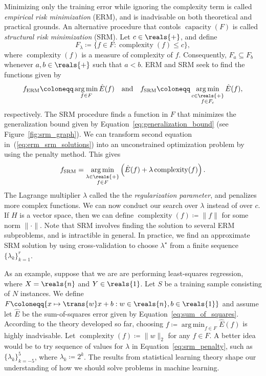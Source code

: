 \documentclass[11pt,a4paper]{article}
\numberwithin{equation}{section}
\newcommand{\capacity}{\operatorname{capacity}}
\newcommand{\complexity}{\operatorname{complexity}}
\newcommand{\argmin}{\operatorname*{arg\,min}}
\begin{document}
Minimizing only the training error while ignoring the complexity term is called
\emph{empirical risk minimization} (ERM), and is inadvisable on both theoretical
and practical grounds. An alternative procedure that contols $\capacity(F)$ is
called \emph{structural risk minimization} (SRM). Let $c \in \reals{+}$, and
define
\begin{equation}
	F_\lambda \coloneqq \{ f \in F : \complexity(f) \leq c \},
	\label{eq:regularized_family}
\end{equation}
where $\complexity(f)$ is a measure of complexity of $f$. Consequently, $F_a
\subseteq F_b$ whenever $a, b \in \reals{+}$ such that $a < b$. ERM and SRM seek
to find the functions given by
\begin{equation}
	f_{\text{ERM}} \coloneqq \argmin_{f \in F} \hat{E}(f)
	\quad\text{and}\quad
	f_{\text{SRM}} \coloneqq \argmin_{\substack{c \in \reals{+} \\ f \in F_c}}
		\hat{E}(f),
	\label{eq:erm_srm_solutions}
\end{equation}
respectively. The SRM procedure finds a function in $F$ that minimizes the
generalization bound given by Equation~\ref{eq:generalization_bound} (see
Figure~\ref{fig:srm_graph}). We can transform second equation
in~(\ref{eq:erm_srm_solutions}) into an unconstrained optimization problem by
using the penalty method. This gives
\begin{equation}
	f_{\text{SRM}} = \argmin_{\substack{\lambda \in \reals{+} \\ f \in F}}
		\left(\hat{E}(f) + \lambda\complexity(f)\right).
	\label{eq:srm_penalty}
\end{equation}
The Lagrange multiplier $\lambda$ called the the \emph{regularization
parameter}, and penalizes more complex functions. We can now conduct our search
over $\lambda$ instead of over $c$. If $H$ is a vector space, then we can define
$\complexity(f) \coloneqq \|f\|$ for some norm ${\|\cdot\|}$. Note that SRM
involves finding the solution to several ERM subproblems, and is intractible in
general. In practice, we find an approximate SRM solution by using
cross-validation to choose $\lambda^\star$ from a finite sequence $\{ \lambda_k
\}_{k = 1}^r$.

As an example, suppose that we are are performing least-squares regression,
where $X = \reals{n}$ and $Y \in \reals{1}$. Let $S$ be a training sample
consisting of $N$ instances. We define $F \coloneqq \{ x \mapsto \trans{w}x + b
: w \in \reals{n}, b \in \reals{1} \}$ and assume let $\hat{E}$ be the
sum-of-squares error given by Equation~\ref{eq:sum_of_squares}. According to the
theory developed so far, choosing $f \coloneqq \argmin_{f \in F} \hat{E}(f)$ is
highly inadvisable. Let $\complexity(f) \coloneqq \|w\|_2$ for any $f \in F$. A
better idea would be to try sequence of values for $\lambda$ in
Equation~\ref{eq:srm_penalty}, such as $\{ \lambda_k \}_{k = -5}^5$, where
$\lambda_k \coloneqq 2^k$. The results from statistical learning theory shape
our understanding of how we should solve problems in machine learning.
\end{document}
